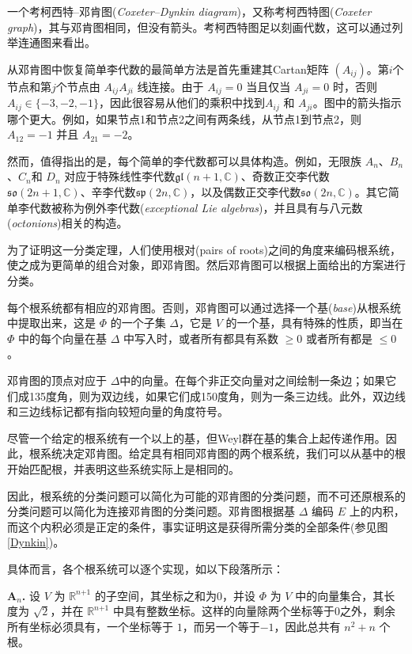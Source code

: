 \documentclass[11pt,fontset=founder]{ctexart}
\begin{document}
一个考柯西特–邓肯图(\textit{Coxeter--Dynkin diagram})，又称考柯西特图(\textit{Coxeter graph})，其与邓肯图相同，但没有箭头。考柯西特图足以刻画代数，这可以通过列举连通图来看出。

从邓肯图中恢复简单李代数的最简单方法是首先重建其Cartan矩阵 $(A_{ij})$。第$i$个节点和第$j$个节点由 $A_{ij}A_{ji}$ 线连接。由于 $A_{ij}=0$ 当且仅当 $A_{ji}=0$ 时，否则 $A_{ij}\in \{-3,-2,-1\}$，因此很容易从他们的乘积中找到$A_{ij}$ 和 $A_{ji}$。图中的箭头指示哪个更大。例如，如果节点1和节点2之间有两条线，从节点1到节点2，则 $A_{12}=-1$ 并且 $A_{21}=-2$。

然而，值得指出的是，每个简单的李代数都可以具体构造。例如，无限族 $A_{n}$、$B_{n}$、$C_{n}$和 $D_{n}$ 对应于特殊线性李代数$ \mathfrak{gl}(n+1,\mathbb{C})$、奇数正交李代数 $\mathfrak{so} (2n+1,\mathbb{C})$、辛李代数$\mathfrak{sp}(2n,\mathbb{C})$，以及偶数正交李代数$\mathfrak{so}(2n,\mathbb{C})$。其它简单李代数被称为例外李代数(\emph{exceptional Lie algebras})，并且具有与八元数(\emph{octonions})相关的构造。

为了证明这一分类定理，人们使用根对(pairs of roots)之间的角度来编码根系统，使之成为更简单的组合对象，即邓肯图。然后邓肯图可以根据上面给出的方案进行分类。

每个根系统都有相应的邓肯图。否则，邓肯图可以通过选择一个基(\emph{base})从根系统中提取出来，这是 $\Phi $ 的一个子集 $\Delta $，它是 $V$ 的一个基，具有特殊的性质，即当在 $\Phi $ 中的每个向量在基 $\Delta $ 中写入时，或者所有都具有系数 $\geq 0$ 或者所有都是 $\leq 0$。

邓肯图的顶点对应于 $\Delta $中的向量。在每个非正交向量对之间绘制一条边；如果它们成135度角，则为双边线，如果它们成150度角，则为一条三边线。此外，双边线和三边线标记都有指向较短向量的角度符号。

尽管一个给定的根系统有一个以上的基，但Weyl群在基的集合上起传递作用。因此，根系统决定邓肯图。给定具有相同邓肯图的两个根系统，我们可以从基中的根开始匹配根，并表明这些系统实际上是相同的。

因此，根系统的分类问题可以简化为可能的邓肯图的分类问题，而不可还原根系的分类问题可以简化为连接邓肯图的分类问题。邓肯图根据基 $\Delta $ 编码 $E$ 上的内积，而这个内积必须是正定的条件，事实证明这是获得所需分类的全部条件(参见图 \ref{Dynkin})。

具体而言，各个根系统可以逐个实现，如以下段落所示：

\textbf{A$_{n}$.} 设 $V$ 为 $\mathbb{R}^{n\mathrm{+}\mathrm{1}}$ 的子空间，其坐标之和为0，并设 $\Phi $ 为 $V$ 中的向量集合，其长度为 $\sqrt{2}$，并在 $\mathbb{R}^{n\mathrm{+}\mathrm{1}}$ 中具有整数坐标。这样的向量除两个坐标等于0之外，剩余所有坐标必须具有，一个坐标等于 $1$，而另一个等于$-1$，因此总共有 $n^{\mathrm{2}}+n$ 个根。
\end{document}
